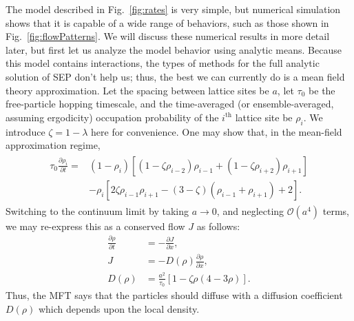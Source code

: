 \documentclass[
reprint,
 amsmath,amssymb,
 aps,
 prl,
]{revtex4-1}
\newcommand{\partDeriv}[2]{\frac{\partial #1}{\partial #2}}
\begin{document}


The model described in Fig.~\ref{fig:rates} is very simple, but numerical simulation shows that it is capable of a wide range of behaviors, such as those shown in Fig.~\ref{fig:flowPatterns}. We will discuss
these numerical results in more detail later, but first let us analyze the model behavior using analytic means.
Because this model contains interactions, the types of methods for the full analytic solution of SEP don't help us; thus, the best we can currently do is a mean field theory approximation.
Let the spacing between lattice sites be $a$, let $\tau_0$ be the free-particle hopping timescale, and the time-averaged (or ensemble-averaged, assuming ergodicity) occupation probability of the $i^{\mathrm{th}}$ lattice site be $\rho_i$.
We introduce $\zeta = 1 - \lambda $ here for convenience.
One may show that, in the mean-field approximation regime,
\begin{align}
\begin{split}
 \tau_0 \partDeriv{\rho_i}{t} = &\left( 1-\rho_i \right) \left[ \left(1-\zeta\rho_{i-2} \right) \rho_{i-1} + \left(1-\zeta\rho_{i+2} \right) \rho_{i+1} \right] \\
 &- \rho_i \left[ 2 \zeta \rho_{i-1} \rho_{i+1}  - (3-\zeta)\left(\rho_{i-1} + \rho_{i+1}\right) + 2 \right].
 \end{split}
 \end{align}
Switching to the continuum limit by taking $a\rightarrow 0$, and neglecting $\mathcal{O}(a^4)$ terms, we may re-express this as a conserved flow $J$ as follows:
\begin{align}
 \partDeriv{\rho}{t} &= - \partDeriv{J}{x}, \\
 J &= -  D(\rho) \partDeriv{\rho}{x}, \\
 D(\rho) &= \frac{a^2}{\tau_0} \left[1 - \zeta \rho\left(4-3\rho\right) \right]. \label{eq:diffCoeff} 
\end{align}
Thus, the MFT says that the particles should diffuse with a diffusion coefficient $D(\rho)$ which depends upon the local density.
\end{document}
